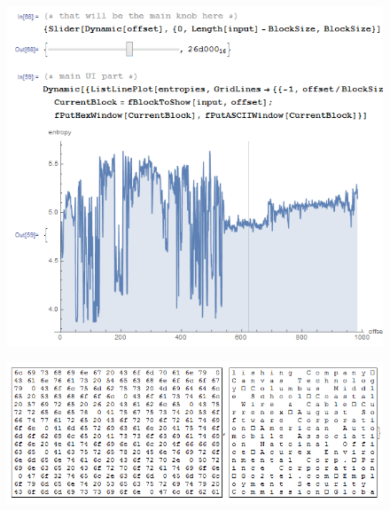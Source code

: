 \begin{figure}[H]
\centering
\includegraphics[width=\EntropyGfxScale]{ff/entropy/geoipisp21.png}
\end{figure}

\begin{figure}[H]
\centering
\includegraphics[width=\EntropyGfxScale]{ff/entropy/geoipisp22.png}
\end{figure}
